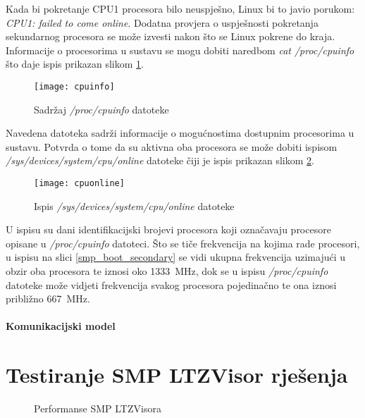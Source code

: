 \documentclass[times, utf8, diplomski, numeric]{fer}
\begin{document}
Kada bi pokretanje CPU1 procesora bilo neuspješno, Linux bi to javio porukom: \textit{CPU1: failed to come online}.
Dodatna provjera o uspješnosti pokretanja sekundarnog procesora se može izvesti nakon što se Linux pokrene do kraja.
Informacije o procesorima u sustavu se mogu dobiti naredbom \textit{cat /proc/cpuinfo} što daje ispis prikazan slikom
\ref{cpuinfo}.
\begin{figure}[H]
  \centering
  \texttt{[image: cpuinfo]}
  \caption{Sadržaj \textit{/proc/cpuinfo} datoteke}
  \label{cpuinfo}
\end{figure}
Navedena datoteka sadrži informacije o mogućnostima dostupnim procesorima u sustavu. Potvrda o tome da su aktivna oba
procesora se može dobiti ispisom \textit{/sys/devices/system/cpu/online} datoteke čiji je ispis prikazan slikom \ref{cpuonline}.
\begin{figure}[H]
  \centering
  \texttt{[image: cpuonline]}
  \caption{Ispis \textit{/sys/devices/system/cpu/online} datoteke}
  \label{cpuonline}
\end{figure}
U ispisu su dani identifikacijski brojevi procesora koji označavaju procesore opisane u \textit{/proc/cpuinfo} datoteci.
Što se tiče frekvencija na kojima rade procesori, u ispisu na slici \ref{smp_boot_secondary} se vidi ukupna frekvencija
uzimajući u obzir oba procesora te iznosi oko 1333~MHz, dok se u ispisu \textit{/proc/cpuinfo} datoteke može vidjeti
frekvencija svakog procesora pojedinačno te ona iznosi približno 667~MHz.

\subsubsection{Komunikacijski model}

\chapter{Testiranje SMP LTZVisor rješenja}

\begin{figure}[H]
  \caption{Performanse SMP LTZVisora}
  \label{ltzvisor_performance}
\end{figure}
\end{document}
